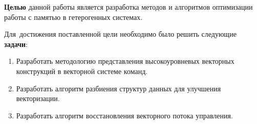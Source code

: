\textbf{Целью} данной работы является разработка методов и алгоритмов оптимизации работы с памятью в гетерогенных системах.

Для~достижения поставленной цели необходимо было решить следующие \textbf{задачи}:
\begin{enumerate}[beginpenalty=10000] %
  \item Разработать методологию представления высокоуровневых векторных конструкций в векторной системе команд.
  \item Разработать алгоритм разбиения структур данных для улучшения векторизации.
  \item Разработать алгоритм восстановления векторного потока управления.
\end{enumerate}

\iffalse


\newcommand{\actuality}{}
\newcommand{\progress}{}
\newcommand{\aim}{{\textbf\aimTXT}}
\newcommand{\tasks}{\textbf{\tasksTXT}}
\newcommand{\novelty}{\textbf{\noveltyTXT}}
\newcommand{\influence}{\textbf{\influenceTXT}}
\newcommand{\methods}{\textbf{\methodsTXT}}
\newcommand{\defpositions}{\textbf{\defpositionsTXT}}
\newcommand{\reliability}{\textbf{\reliabilityTXT}}
\newcommand{\probation}{\textbf{\probationTXT}}
\newcommand{\contribution}{\textbf{\contributionTXT}}
\newcommand{\publications}{\textbf{\publicationsTXT}}

\newcommand{\actuality}{\pdfbookmark[1]{Актуальность}{actuality}\underline{\textbf{\actualityTXT}}}
\newcommand{\progress}{\pdfbookmark[1]{Разработанность темы}{progress}\underline{\textbf{\progressTXT}}}
\newcommand{\aim}{\pdfbookmark[1]{Цели}{aim}\underline{{\textbf\aimTXT}}}
\newcommand{\tasks}{\pdfbookmark[1]{Задачи}{tasks}\underline{\textbf{\tasksTXT}}}
\newcommand{\aimtasks}{\pdfbookmark[1]{Цели и задачи}{aimtasks}\aimtasksTXT}
\newcommand{\novelty}{\pdfbookmark[1]{Научная новизна}{novelty}\underline{\textbf{\noveltyTXT}}}
\newcommand{\influence}{\pdfbookmark[1]{Практическая значимость}{influence}\underline{\textbf{\influenceTXT}}}
\newcommand{\methods}{\pdfbookmark[1]{Методология и методы исследования}{methods}\underline{\textbf{\methodsTXT}}}
\newcommand{\defpositions}{\pdfbookmark[1]{Положения, выносимые на защиту}{defpositions}\underline{\textbf{\defpositionsTXT}}}
\newcommand{\reliability}{\pdfbookmark[1]{Достоверность}{reliability}\underline{\textbf{\reliabilityTXT}}}
\newcommand{\probation}{\pdfbookmark[1]{Апробация}{probation}\underline{\textbf{\probationTXT}}}
\newcommand{\contribution}{\pdfbookmark[1]{Личный вклад}{contribution}\underline{\textbf{\contributionTXT}}}
\newcommand{\publications}{\pdfbookmark[1]{Публикации}{publications}\underline{\textbf{\publicationsTXT}}}


